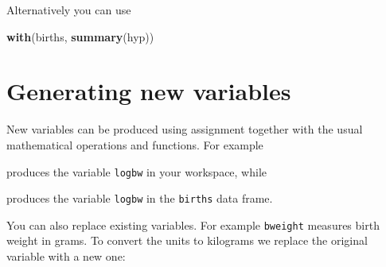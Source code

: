 \documentclass[
]{book}
\newenvironment{Shaded}{\begin{snugshade}}{\end{snugshade}}
\newcommand{\DecValTok}[1]{\textcolor[rgb]{0.00,0.00,0.81}{#1}}
\newcommand{\FunctionTok}[1]{\textcolor[rgb]{0.13,0.29,0.53}{\textbf{#1}}}
\newcommand{\NormalTok}[1]{#1}
\newcommand{\OtherTok}[1]{\textcolor[rgb]{0.56,0.35,0.01}{#1}}
\newcommand{\SpecialCharTok}[1]{\textcolor[rgb]{0.81,0.36,0.00}{\textbf{#1}}}
\begin{document}
\begin{Shaded}
\end{Shaded}

Alternatively you can use

\begin{Shaded}
\begin{Highlighting}[]
\FunctionTok{with}\NormalTok{(births, }\FunctionTok{summary}\NormalTok{(hyp))}
\end{Highlighting}
\end{Shaded}

\section{Generating new variables}\label{generating-new-variables}

New variables can be produced using assignment together with the usual
mathematical operations and functions. For example

\begin{Shaded}
\end{Shaded}

produces the variable \texttt{logbw} in your workspace, while

\begin{Shaded}
\end{Shaded}

produces the variable \texttt{logbw} in the \texttt{births} data frame.

You can also replace existing variables. For example \texttt{bweight} measures
birth weight in grams. To convert the units to kilograms we replace the
original variable with a new one:

\begin{Shaded}
\end{Shaded}
\end{document}
